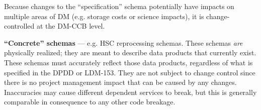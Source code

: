 Because changes to the ``specification'' schema potentially have impacts on multiple areas of DM (e.g.
storage costs or science impacts), it is change-controlled at the DM-CCB level.


\textbf{``Concrete'' schemas} --- e.g. HSC reprocessing schemas. These schemas \textit{are}
physically realized; they are meant to describe data products that currently exist. These schemas
must accurately reflect those data products, regardless of what is specified in the DPDD or LDM-153.
They are not subject to change control since there is no project management impact that can be
caused by any changes. Inaccuracies may cause different dependent services to break, but this is
generally comparable in consequence to any other code breakage.
